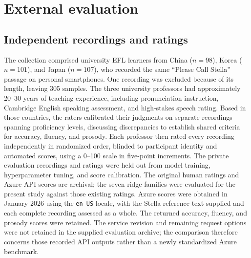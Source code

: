\documentclass[10pt]{article}
\begin{document}
\section{External evaluation}
\subsection{Independent recordings and ratings}
The collection comprised university EFL learners from China ($n=98$), Korea ($n=101$), and Japan ($n=107$), who recorded the same ``Please Call Stella'' passage on personal smartphones. One recording was excluded because of its length, leaving 305 samples. The three university professors had approximately 20--30 years of teaching experience, including pronunciation instruction, Cambridge English speaking assessment, and high-stakes speech rating. Based in those countries, the raters calibrated their judgments on separate recordings spanning proficiency levels, discussing discrepancies to establish shared criteria for accuracy, fluency, and prosody. Each professor then rated every recording independently in randomized order, blinded to participant identity and automated scores, using a 0--100 scale in five-point increments. The private evaluation recordings and ratings were held out from model training, hyperparameter tuning, and score calibration. The original human ratings and Azure API scores are archival; the seven ridge families were evaluated for the present study against those existing ratings. Azure scores were obtained in January 2026 using the \texttt{en-US} locale, with the Stella reference text supplied and each complete recording assessed as a whole. The returned accuracy, fluency, and prosody scores were retained. The service revision and remaining request options were not retained in the supplied evaluation archive; the comparison therefore concerns those recorded API outputs rather than a newly standardized Azure benchmark.
\end{document}
